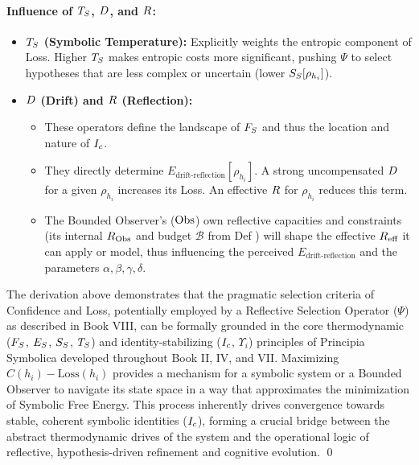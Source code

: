 \paragraph{Influence of \(T_S\), \(D\), and \(R\):}
\begin{itemize}
    \item \textbf{\(T_S\) (Symbolic Temperature):} Explicitly weights the entropic component of Loss. Higher \(T_S\) makes entropic costs more significant, pushing $\Psi$ to select hypotheses that are less complex or uncertain (lower \(S_S[\rho_{h_i}]\)).
    \item \textbf{\(D\) (Drift) and \(R\) (Reflection):}
    \begin{itemize}
        \item These operators define the landscape of \(F_S\) and thus the location and nature of \(I_c\).
        \item They directly determine \(E_{\text{drift-reflection}}[\rho_{h_i}]\). A strong uncompensated \(D\) for a given \(\rho_{h_i}\) increases its Loss. An effective \(R\) for \(\rho_{h_i}\) reduces this term.
        \item The Bounded Observer's ($\mathrm{Obs}$) own reflective capacities and constraints (its internal \(R_{\mathrm{Obs}}\) and budget $\mathcal{B}$ from Def ) will shape the effective \(R_{\text{eff}}\) it can apply or model, thus influencing the perceived \(E_{\text{drift-reflection}}\) and the parameters \(\alpha, \beta, \gamma, \delta\).
    \end{itemize}
\end{itemize}
\begin{scholium}
\label{scholium:bk7_reflective_selection_as_principled_convergence}
The derivation above demonstrates that the pragmatic selection criteria of Confidence and Loss, potentially employed by a Reflective Selection Operator ($\Psi$) as described in Book VIII, can be formally grounded in the core thermodynamic (\(F_S\), \(E_S\), \(S_S\), \(T_S\)) and identity-stabilizing (\(I_c\), \(\Upsilon_i\)) principles of Principia Symbolica developed throughout Book II, IV, and VII. Maximizing \(C(h_i) - \text{Loss}(h_i)\) provides a mechanism for a symbolic system or a Bounded Observer to navigate its state space in a way that approximates the minimization of Symbolic Free Energy. This process inherently drives convergence towards stable, coherent symbolic identities (\(I_c\)), forming a crucial bridge between the abstract thermodynamic drives of the system and the operational logic of reflective, hypothesis-driven refinement and cognitive evolution.
\qed {}
\end{scholium}